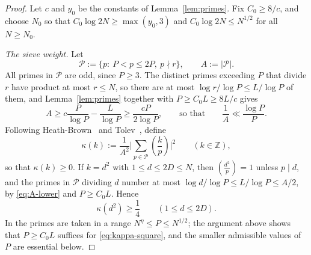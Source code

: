 \documentclass[11pt]{amsart}
\numberwithin{equation}{section}
\numberwithin{figure}{section}
\theoremstyle{definition}
\newcommand{\Z}{\mathbb{Z}}
\begin{document}
\begin{proof}
Let $c$ and $y_0$ be the constants of Lemma~\ref{lem:primes}.  Fix
$C_0\ge8/c$, and choose $N_0$ so that $C_0\log 2N\ge\max(y_0,3)$ and
$C_0\log2N\le N^{1/2}$ for all $N\ge N_0$.

\medskip\noindent\emph{The sieve weight.}
Let
\[
  \mathcal P:=\{p:\ P<p\le2P,\ p\nmid r\},\qquad A:=|\mathcal P|.
\]
All primes in $\mathcal P$ are odd, since $P\ge3$.  The distinct primes
exceeding $P$ that divide $r$ have product at most $r\le N$, so there are
at most $\log r/\log P\le L/\log P$ of them, and Lemma~\ref{lem:primes}
together with $P\ge C_0L\ge8L/c$ gives
\begin{equation}\label{eq:A-lower}
  A\ge c\frac P{\log P}-\frac L{\log P}\ge\frac{cP}{2\log P},
  \qquad\text{so that}\qquad
  \frac1A\ll\frac{\log P}P.
\end{equation}
Following Heath-Brown~\cite{HB} and Tolev~\cite{Tolev}, define
\begin{equation}\label{eq:kappa}
  \kappa(k):=\frac1{A^2}\bigg|\sum_{p\in\mathcal P}\left(\frac kp\right)\bigg|^2
  \qquad(k\in\Z),
\end{equation}
so that $\kappa(k)\ge0$.  If $k=d^2$ with $1\le d\le2D\le N$, then
$(\tfrac{d^2}p)=1$ unless $p\mid d$, and the primes in $\mathcal P$
dividing $d$ number at most $\log d/\log P\le L/\log P\le A/2$, by
\eqref{eq:A-lower} and $P\ge C_0L$.  Hence
\begin{equation}\label{eq:kappa-square}
  \kappa(d^2)\ge\frac14\qquad(1\le d\le2D).
\end{equation}
In \cite{Tolev} the primes are taken in a range $N^{\eta}\le P\le N^{1/2}$;
the argument above shows that $P\ge C_0L$ suffices for
\eqref{eq:kappa-square}, and the smaller admissible values of $P$ are
essential below.


\end{proof}
\end{document}
